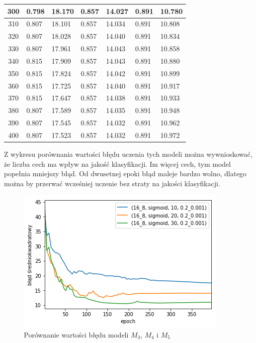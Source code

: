 \documentclass{report}
\begin{document}
\begin{minipage}{\textwidth}
\begin{longtable}{|c|l|l|l|l|l|l|}
                     300 & 0.798 & 18.170 & 0.857 & 14.027 & 0.891 & 10.780 \\ \hline
                     310 & 0.807 & 18.101 & 0.857 & 14.034 & 0.891 & 10.808 \\ \hline
                     320 & 0.807 & 18.028 & 0.857 & 14.040 & 0.891 & 10.834 \\ \hline
                     330 & 0.807 & 17.961 & 0.857 & 14.043 & 0.891 & 10.858 \\ \hline
                     340 & 0.815 & 17.909 & 0.857 & 14.043 & 0.891 & 10.880 \\ \hline
                     350 & 0.815 & 17.824 & 0.857 & 14.042 & 0.891 & 10.899 \\ \hline
                     360 & 0.815 & 17.725 & 0.857 & 14.040 & 0.891 & 10.917 \\ \hline
                     370 & 0.815 & 17.647 & 0.857 & 14.038 & 0.891 & 10.933 \\ \hline
                     380 & 0.807 & 17.589 & 0.857 & 14.035 & 0.891 & 10.948 \\ \hline
                     390 & 0.807 & 17.545 & 0.857 & 14.032 & 0.891 & 10.962 \\ \hline
                     400 & 0.807 & 17.523 & 0.857 & 14.032 & 0.891 & 10.972 \\ \hline
                 \end{longtable}
    \end{minipage}

    Z wykresu porównania wartości błędu uczenia tych modeli można wywnioskować, że liczba cech ma wpływ na jakość klasyfikacji.
    Im więcej cech, tym model popełnia mniejszy błąd.
    Od dwusetnej epoki błąd maleje bardzo wolno, dlatego można by przerwać wcześniej uczenie bez straty na jakości klasyfikacji.

    \begin{figure}[htp]
        \centering
        \includegraphics[scale=0.8]{./img/feat-error.png}
        \caption{Porównanie wartości błędu modeli $M_3$, $M_4$ i $M_5$}
    \end{figure}
\end{document}
